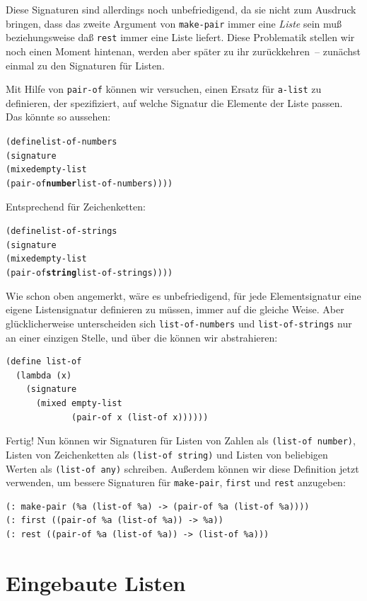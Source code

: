 Diese Signaturen sind allerdings noch unbefriedigend, da sie nicht zum
Ausdruck bringen, dass das zweite Argument von \texttt{make-pair} immer
eine \emph{Liste} sein muß beziehungsweise daß \texttt{rest} immer
eine Liste liefert.  Diese Problematik stellen wir noch einen Moment
hintenan, werden aber später zu ihr zurückkehren~-- zunächst einmal zu
den Signaturen für Listen.

Mit Hilfe von \texttt{pair-of} können wir versuchen, einen Ersatz für
\texttt{a-list} zu definieren, der spezifiziert, auf welche Signatur
die Elemente der Liste passen.  Das könnte so aussehen:
%
\begin{alltt}
(define list-of-numbers
  (signature
    (mixed empty-list
           (pair-of \textbf{number} list-of-numbers))))
\end{alltt}
%
Entsprechend für Zeichenketten:
%
\begin{alltt}
(define list-of-strings
  (signature
    (mixed empty-list
           (pair-of \textbf{string} list-of-strings))))
\end{alltt}
%
Wie schon oben angemerkt, wäre es unbefriedigend, für jede Elementsignatur eine
eigene Listensignatur definieren zu müssen, immer auf die gleiche
Weise.  Aber glücklicherweise unterscheiden sich
\texttt{list-of-numbers} und \texttt{list-of-strings} nur an einer
einzigen Stelle, und über die können wir abstrahieren:
%
\begin{verbatim}
(define list-of
  (lambda (x)
    (signature
      (mixed empty-list
             (pair-of x (list-of x))))))
\end{verbatim}
%
Fertig!  Nun können wir Signaturen für Listen von Zahlen als
\texttt{(list-of number)}, Listen von Zeichenketten als
\texttt{(list-of string)} und Listen von beliebigen Werten als
\texttt{(list-of any)} schreiben.  Außerdem können wir diese
Definition jetzt verwenden, um bessere Signaturen für
\texttt{make-pair}, \texttt{first} und \texttt{rest} anzugeben:
%
\begin{verbatim}
(: make-pair (%a (list-of %a) -> (pair-of %a (list-of %a))))
(: first ((pair-of %a (list-of %a)) -> %a))
(: rest ((pair-of %a (list-of %a)) -> (list-of %a)))
\end{verbatim}
%

\section{Eingebaute Listen}

